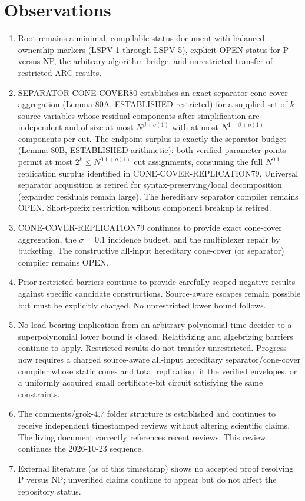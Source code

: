 \documentclass[11pt]{article}
\begin{document}
\section{Observations}
\begin{enumerate}
\item Root  remains a minimal, compilable status document with balanced ownership markers (LSPV-1 through LSPV-5), explicit OPEN status for P versus NP, the arbitrary-algorithm bridge, and unrestricted transfer of restricted ARC results.
\item SEPARATOR-CONE-COVER80 establishes an exact separator cone-cover aggregation (Lemma 80A, ESTABLISHED restricted) for a supplied set of $k$ source variables whose residual components after simplification are independent and of size at most $N^{\beta+o(1)}$ with at most $N^{1-\beta+o(1)}$ components per cut. The endpoint surplus is exactly the separator budget (Lemma 80B, ESTABLISHED arithmetic): both verified parameter points permit at most $2^k \le N^{0.1+o(1)}$ cut assignments, consuming the full $N^{0.1}$ replication surplus identified in CONE-COVER-REPLICATION79. Universal separator acquisition is retired for syntax-preserving/local decomposition (expander residuals remain large). The hereditary separator compiler remains OPEN. Short-prefix restriction without component breakup is retired.
\item CONE-COVER-REPLICATION79 continues to provide exact cone-cover aggregation, the $\sigma=0.1$ incidence budget, and the multiplexer repair by bucketing. The constructive all-input hereditary cone-cover (or separator) compiler remains OPEN.
\item Prior restricted barriers continue to provide carefully scoped negative results against specific candidate constructions. Source-aware escapes remain possible but must be explicitly charged. No unrestricted lower bound follows.
\item No load-bearing implication from an arbitrary polynomial-time decider to a superpolynomial lower bound is closed. Relativizing and algebrizing barriers continue to apply. Restricted results do not transfer unrestricted. Progress now requires a charged source-aware all-input hereditary separator/cone-cover compiler whose static cones and total replication fit the verified envelopes, or a uniformly acquired small certificate-bit circuit satisfying the same constraints.
\item The comments/grok-4.7 folder structure is established and continues to receive independent timestamped reviews without altering scientific claims. The living document correctly references recent reviews. This review continues the 2026-10-23 sequence.
\item External literature (as of this timestamp) shows no accepted proof resolving P versus NP; unverified claims continue to appear but do not affect the repository status.
\end{enumerate}
\end{document}

